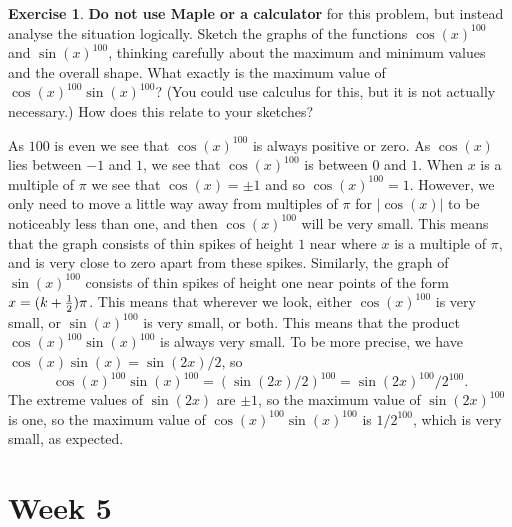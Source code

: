 \documentclass[a4paper]{amsart}
\theoremstyle{definition}
\newtheorem{exercise}{Exercise}[section]
\newenvironment{solution}{{\noindent \bf Solution:}}{}
\begin{document}
\begin{exercise}
 \textbf{Do not use Maple or a calculator} for this problem, but
 instead analyse the situation logically.  Sketch the graphs of the
 functions $\cos(x)^{100}$ and $\sin(x)^{100}$, thinking carefully
 about the maximum and minimum values and the overall shape.  What
 exactly is the maximum value of $\cos(x)^{100}\sin(x)^{100}$?  (You
 could use calculus for this, but it is not actually necessary.)  How
 does this relate to your sketches?
\end{exercise}
\begin{solution}
 As $100$ is even we see that $\cos(x)^{100}$ is always positive or
 zero.  As $\cos(x)$ lies between $-1$ and $1$, we see that
 $\cos(x)^{100}$ is between $0$ and $1$.  When $x$ is a multiple of
 $\pi$ we see that $\cos(x)=\pm 1$ and so $\cos(x)^{100}=1$.  However,
 we only need to move a little way away from multiples of $\pi$ for
 $|\cos(x)|$ to be noticeably less than one, and then $\cos(x)^{100}$
 will be very small.  This means that the graph consists of thin
 spikes of height $1$ near where $x$ is a multiple of $\pi$, and is
 very close to zero apart from these spikes.  Similarly, the graph of
 $\sin(x)^{100}$ consists of thin spikes of height one near points of
 the form $x=(k+\tfrac{1}{2})\pi$.  This means that wherever we look, either
 $\cos(x)^{100}$ is very small, or $\sin(x)^{100}$ is very small, or
 both.  This means that the product $\cos(x)^{100}\sin(x)^{100}$ is
 always very small.  To be more precise, we have
 $\cos(x)\sin(x)=\sin(2x)/2$, so 
 \[ \cos(x)^{100}\sin(x)^{100} = (\sin(2x)/2)^{100} = 
     \sin(2x)^{100}/2^{100}.
 \]
 The extreme values of $\sin(2x)$ are $\pm 1$, so the maximum value of
 $\sin(2x)^{100}$ is one, so the maximum value of
 $\cos(x)^{100}\sin(x)^{100}$ is $1/2^{100}$, which is very small, as expected.
\end{solution}


\section*{Week 5}
\addtocounter{section}{1}\setcounter{exercise}{0}
\end{document}

